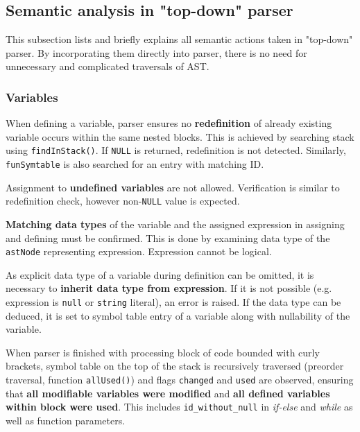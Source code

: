 \documentclass[a4paper, 11pt]{article}
\begin{document}
\subsection{Semantic analysis in "top-down" parser}
This subsection lists and briefly explains all semantic actions taken in "top-down" parser.
By incorporating them directly into parser, there is no need for unnecessary and complicated traversals of AST.

\subsubsection{Variables}
When defining a variable, parser ensures no \textbf{redefinition} of already
existing variable occurs within the same nested blocks. This is achieved by searching stack using
\verb|findInStack()|. If \verb|NULL| is returned, redefinition is not detected. Similarly,
\verb|funSymtable| is also searched for an entry with matching ID.
\par Assignment to \textbf{undefined variables} are not allowed. Verification is similar to redefinition check,
however non-\verb|NULL| value is expected.
\par \textbf{Matching data types} of the variable and the assigned expression in assigning and defining must be confirmed.
This is done by examining data type of the \verb|astNode| representing expression. Expression cannot be logical.
\par As explicit data type of a variable during definition can be omitted, it is necessary to \textbf{inherit data type
from expression}. If it is not possible (e.g. expression is \verb|null| or \verb|string| literal), an error is raised.
If the data type can be deduced, it is set to symbol table entry of a variable along with nullability of the variable.
\par When parser is finished with processing block of code bounded with curly brackets, symbol table on the top of the stack
is recursively traversed (preorder traversal, function \verb|allUsed()|) and flags \verb|changed| and \verb|used| are observed,
ensuring that \textbf{all modifiable variables were modified} and \textbf{all defined variables within block were used}. This includes
\verb|id_without_null| in \textit{if-else} and \textit{while} as well as function parameters.
\end{document}
